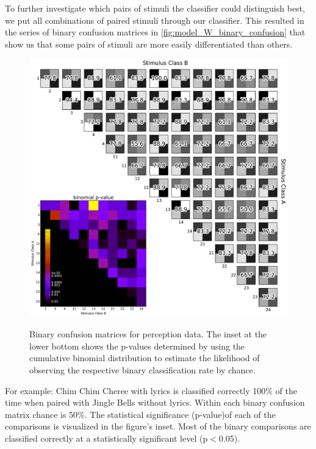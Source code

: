To further investigate which pairs of stimuli the classifier could distinguish best, we put all combinations of paired stimuli through our classifier.
This resulted in the series of binary confusion matrices in \autoref{fig:model_W_binary_confusion} that show us that some pairs of stimuli are more easily differentiated than others. 
\begin{figure}[htb] 
  \begin{center}
    \includegraphics[width=.75\textwidth,keepaspectratio=true]{Figures/model_W_binary_confusion}
   \\\vspace{-0.8em}
    \caption{Binary confusion matrices for perception data.
    The inset at the lower bottom shows the p-values determined by using the cumulative binomial distribution to estimate the likelihood of observing the respective binary classification rate by chance.}
    \label{fig:model_W_binary_confusion}
  \end{center}
  \vspace{-1em}
\end{figure}
For example: Chim Chim Cheree with lyrics is classified correctly 100\% of the time when paired with Jingle Bells without lyrics. 
Within each binary confusion matrix chance is 50\%.
The statistical significance (p-value)of each of the comparisons is visualized in the figure's inset. 
Most of the binary comparisons are classified correctly at a statistically significant level (p$<$0.05). 

